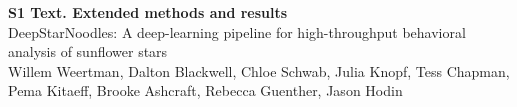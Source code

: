 \documentclass[10pt,letterpaper]{article}
\begin{document}

\begin{flushleft}
{\Large
\textbf{S1 Text. Extended methods and results}
}
\newline
\\
DeepStarNoodles: A deep-learning pipeline for high-throughput behavioral analysis of sunflower stars
\\
\bigskip
Willem Weertman, Dalton Blackwell, Chloe Schwab, Julia Knopf, Tess Chapman, Pema Kitaeff, Brooke Ashcraft, Rebecca Guenther, Jason Hodin
\end{flushleft}






\end{document}
